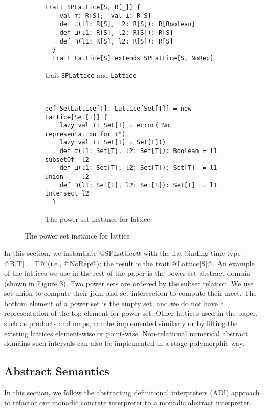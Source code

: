 \begin{figure}[h!]
  \centering
  \begin{subfigure}[b]{0.45\textwidth}
  \begin{lstlisting}[style=small]
  trait SPLattice[S, R[_]] {
    val ⊤: R[S];  val ⊥: R[S]
    def ⊑(l1: R[S], l2: R[S]): R[Boolean]
    def ⊔(l1: R[S], l2: R[S]): R[S]
    def ⊓(l1: R[S], l2: R[S]): R[S]
  }
  trait Lattice[S] extends SPLattice[S, NoRep]
  \end{lstlisting}
  \caption{trait \texttt{SPLattice} and \texttt{Lattice}} \label{fig:splattice}
  \end{subfigure}
  ~
  \begin{subfigure}[b]{0.6\textwidth}
\begin{lstlisting}[style=small]
  def SetLattice[T]: Lattice[Set[T]] = new Lattice[Set[T]] {
    lazy val ⊤: Set[T] = error("No representation for ⊤")
    lazy val ⊥: Set[T] = Set[T]()
    def ⊑(l1: Set[T], l2: Set[T]): Boolean = l1 subsetOf  l2
    def ⊔(l1: Set[T], l2: Set[T]): Set[T]  = l1 union     l2
    def ⊓(l1: Set[T], l2: Set[T]): Set[T]  = l1 intersect l2
  }
\end{lstlisting}
  \caption{The power set instance for lattice} \label{fig:powerset}
\end{subfigure}
\end{figure}

In this section, we instantiate @SPLattice@ with the flat binding-time
type @R[T] = T@ (i.e., @NoRep@); the result is the trait @Lattice[S]@.
An example of the lattices we use in the rest of the paper is the power set
abstract domain (shown in Figure \ref{fig:powerset}). Two power sets are
ordered by the subset relation. We use set union to compute their
join, and set intersection to compute their meet.  The bottom element of a
power set is the empty set, and we do not have a representation of the top element for
power set.  Other lattices used in the paper, such as products and maps, can be
implemented similarly or by lifting the existing lattices element-wise or
point-wise.  Non-relational numerical abstract domains such intervals can also
be implemented in a stage-polymorphic way.

\subsection{Abstract Semantics}

In this section, we follow the abstracting definitional interpreters
(ADI) approach \cite{DBLP:journals/pacmpl/DaraisLNH17} to refactor our monadic
concrete interpreter to a monadic abstract interpreter.


